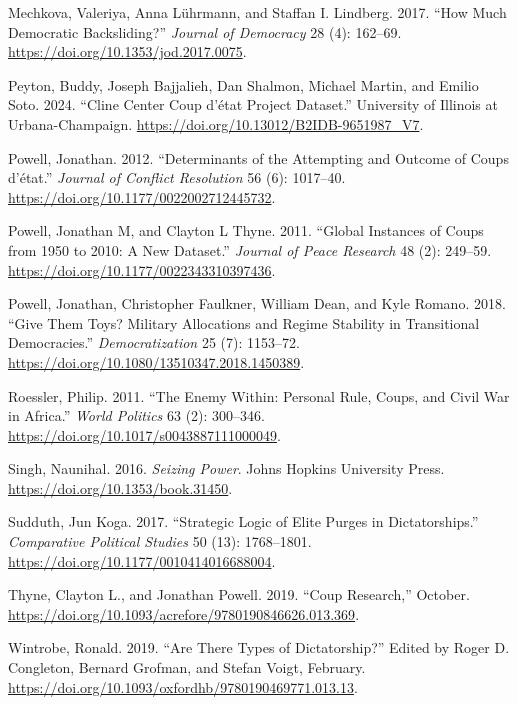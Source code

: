 \documentclass[
  12pt,
]{report}
\newlength{\cslhangindent}
\newenvironment{CSLReferences}[2] %
 {\begin{list}{}{%
  \setlength{\itemindent}{0pt}
  \setlength{\leftmargin}{0pt}
  \setlength{\parsep}{0pt}
  \ifodd #1
   \setlength{\leftmargin}{\cslhangindent}
   \setlength{\itemindent}{-1\cslhangindent}
  \fi
  \setlength{\itemsep}{#2\baselineskip}}}
 {\end{list}}
\begin{document}
\begin{CSLReferences}{1}{0}
Mechkova, Valeriya, Anna Lührmann, and Staffan I. Lindberg. 2017. {``How
Much Democratic Backsliding?''} \emph{Journal of Democracy} 28 (4):
162--69. \url{https://doi.org/10.1353/jod.2017.0075}.

Peyton, Buddy, Joseph Bajjalieh, Dan Shalmon, Michael Martin, and Emilio
Soto. 2024. {``Cline Center Coup d{'}état Project Dataset.''} University
of Illinois at Urbana-Champaign.
\url{https://doi.org/10.13012/B2IDB-9651987_V7}.

Powell, Jonathan. 2012. {``Determinants of the Attempting and Outcome of
Coups d{'}état.''} \emph{Journal of Conflict Resolution} 56 (6):
1017--40. \url{https://doi.org/10.1177/0022002712445732}.

Powell, Jonathan M, and Clayton L Thyne. 2011. {``Global Instances of
Coups from 1950 to 2010: A New Dataset.''} \emph{Journal of Peace
Research} 48 (2): 249--59.
\url{https://doi.org/10.1177/0022343310397436}.

Powell, Jonathan, Christopher Faulkner, William Dean, and Kyle Romano.
2018. {``Give Them Toys? Military Allocations and Regime Stability in
Transitional Democracies.''} \emph{Democratization} 25 (7): 1153--72.
\url{https://doi.org/10.1080/13510347.2018.1450389}.

Roessler, Philip. 2011. {``The Enemy Within: Personal Rule, Coups, and
Civil War in Africa.''} \emph{World Politics} 63 (2): 300--346.
\url{https://doi.org/10.1017/s0043887111000049}.

Singh, Naunihal. 2016. \emph{Seizing Power}. Johns Hopkins University
Press. \url{https://doi.org/10.1353/book.31450}.

Sudduth, Jun Koga. 2017. {``Strategic Logic of Elite Purges in
Dictatorships.''} \emph{Comparative Political Studies} 50 (13):
1768--1801. \url{https://doi.org/10.1177/0010414016688004}.

Thyne, Clayton L., and Jonathan Powell. 2019. {``Coup Research,''}
October. \url{https://doi.org/10.1093/acrefore/9780190846626.013.369}.

Wintrobe, Ronald. 2019. {``Are There Types of Dictatorship?''} Edited by
Roger D. Congleton, Bernard Grofman, and Stefan Voigt, February.
\url{https://doi.org/10.1093/oxfordhb/9780190469771.013.13}.

\end{CSLReferences}
\end{document}
